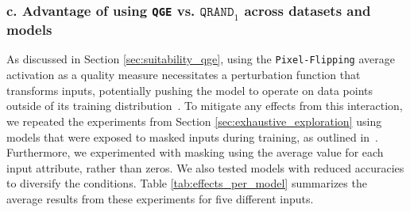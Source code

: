 \subsubsection{c. Advantage of using \texttt{QGE} vs. $\texttt{QRAND}_1$ across datasets and models}
\label{sec:experiments_datasets_models}
As discussed in Section \ref{sec:suitability_qge}, using the \texttt{Pixel-Flipping} average activation as a quality measure necessitates a perturbation function that transforms inputs, potentially pushing the model to operate on data points outside of its training distribution~\cite{hase2021}. To mitigate any effects from this interaction, we repeated the experiments from Section \ref{sec:exhaustive_exploration} using models that were exposed to masked inputs during training, as outlined in~\cite{hase2021}. Furthermore, we experimented with masking using the average value for each input attribute, rather than zeros. We also tested models with reduced accuracies to diversify the conditions. Table \ref{tab:effects_per_model} summarizes the average results from these experiments for five different inputs.

